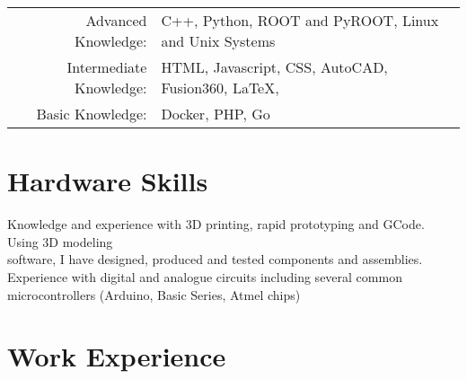 \documentclass[a4paper,10pt]{article} %
\begin{document}
\begin{tabular}{rl}

Advanced Knowledge: & C++, Python, ROOT and PyROOT, Linux and Unix Systems \\
Intermediate Knowledge: & HTML, Javascript, CSS, AutoCAD, Fusion360, \LaTeX, \\
Basic Knowledge:        & Docker, PHP, Go
\end{tabular}
\vspace{1mm}


\section{Hardware Skills}
Knowledge and experience with 3D printing, rapid prototyping and GCode. Using 3D modeling\\
software, I have designed, produced and tested components and assemblies.\\
Experience with digital and analogue circuits including several common microcontrollers (Arduino, Basic Series, Atmel chips) \\
\vspace{0mm}



\section{Work Experience}
\end{document}
